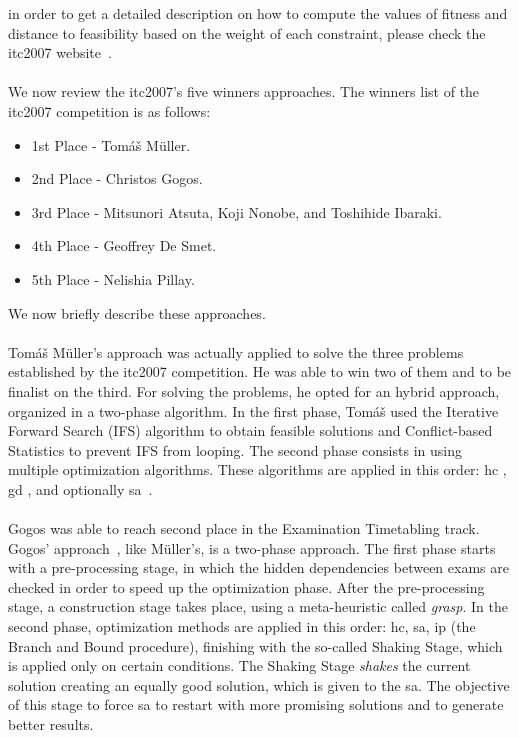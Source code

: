 in order to get a detailed description on how to compute the values of fitness and distance to feasibility based on the weight of each constraint, please check the \gls{itc2007} website~\cite{McCollum2007}.\\
\\
We now review the \gls{itc2007}'s five winners approaches. The winners list of the \gls{itc2007} competition is as follows:
\begin{itemize}
	\item 1st Place - Tom\'{a}\v{s} M\"{u}ller.
	\item 2nd Place - Christos Gogos.
	\item 3rd Place - Mitsunori Atsuta, Koji Nonobe, and Toshihide Ibaraki.
	\item 4th Place - Geoffrey De Smet.
	\item 5th Place - Nelishia Pillay.
\end{itemize}
We now briefly describe these approaches.\\
\\
Tom\'{a}\v{s} M\"{u}ller's approach \cite{Mueller2009} was actually applied to solve the three problems established by the \gls{itc2007} competition. He was able to win two of them and to be finalist on the third. For solving the problems, he opted for an hybrid approach, organized in a two-phase algorithm. In the first phase, Tom\'{a}\v{s} used the Iterative Forward Search (IFS) algorithm \cite{Mueller2005} to obtain feasible solutions and Conflict-based Statistics \cite{Mueller2004} to prevent IFS from looping. The second phase consists in using multiple optimization algorithms. These algorithms are applied in this order: \gls{hc} \cite{Russell2010}, \gls{gd} \cite{Dueck1993}, and optionally \gls{sa}~\cite{Kirkpatrick1983}.\\
\\
Gogos was able to reach second place in the Examination Timetabling track. Gogos' approach~\cite{Gogos2012}, like M\"{u}ller's, is a two-phase approach. The first phase starts with a pre-processing stage, in which the hidden dependencies between exams are checked in order to speed up the optimization phase. After the pre-processing stage, a construction stage takes place, using a meta-heuristic called \textit{\gls{grasp}}. In the second phase, optimization methods are applied in this order: \gls{hc}, \gls{sa}, \gls{ip} (the Branch and Bound procedure), finishing with the so-called Shaking Stage, which is applied only on certain conditions. The Shaking Stage \textit{shakes} the current solution creating an equally good solution, which is given to the \gls{sa}. The objective of this stage to force \gls{sa} to restart with more promising solutions and to generate better results.\\
